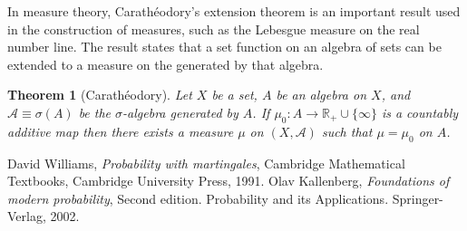 \documentclass[12pt]{article}
\newtheorem*{theorem}{Theorem}
\begin{document}
In measure theory, Carath\'eodory's extension theorem is an important result used in the construction of measures, such as the Lebesgue measure on the real number line. The result states that a  set function on an algebra of sets can be extended to a measure on the  generated by that algebra.

\begin{theorem}[Carath\'eodory]
Let $X$ be a set, $A$ be an algebra on $X$, and $\mathcal{A}\equiv\sigma(A)$ be the $\sigma$-algebra generated by $A$. If $\mu_0\colon A\rightarrow\mathbb{R}_+\cup\{\infty\}$ is a countably additive map then there exists a measure $\mu$ on $(X,\mathcal{A})$ such that $\mu=\mu_0$ on $A$.
\end{theorem}

\begin{thebibliography}{9}
David Williams, \emph{Probability with martingales},
Cambridge Mathematical Textbooks, Cambridge University Press, 1991.
Olav Kallenberg, \emph{Foundations of modern probability}, Second edition. Probability and its Applications. Springer-Verlag, 2002.
\end{thebibliography}
\end{document}
